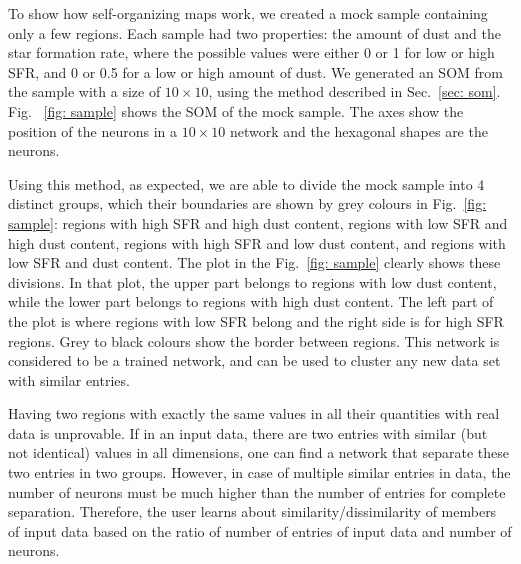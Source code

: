 To show how self-organizing maps work, we created a mock sample containing only a few regions.
Each sample had two properties: the amount of dust and the star formation rate, where the possible values were
either 0 or 1 for low or high SFR, and 0 or 0.5 for a low or high amount of dust. 
 We generated an SOM from the sample with a size of $10 \times 10$, using the method described in Sec.~\ref{sec: som}.
 Fig. ~\ref{fig: sample} shows the SOM of the mock sample. 
 The axes show the position of the neurons in a $10 \times 10$ network and the hexagonal shapes are the neurons.
 
Using this method, as expected, we are able to divide the mock sample into 4 distinct groups, which their boundaries are shown by grey colours in Fig.~\ref{fig: sample}: regions with high SFR and high dust content, regions with low SFR and high dust content, regions with high SFR and low dust content, and regions with low SFR and dust content. 
The plot in the Fig.~\ref{fig: sample} clearly shows these divisions.
In that plot, the upper part belongs to regions with low dust content, while the lower part belongs to regions with high dust content.
The left part of the plot is where regions with low SFR belong and the right side is for high SFR regions.
Grey to black colours show the border between regions.
This network is considered to be a trained network, and can be used to cluster any new data set with similar entries.

Having two regions with exactly the same values in all their quantities with real data is unprovable. 
If in an input data, there are two entries with similar (but not identical) values in all dimensions, one can find a network that separate these two entries in two groups.  
However, in case of multiple similar entries in data, the number of neurons must be much higher than the number of entries for complete separation.
Therefore, the user learns about similarity/dissimilarity of members of input data based on the ratio of number of entries of input data and number of neurons. 